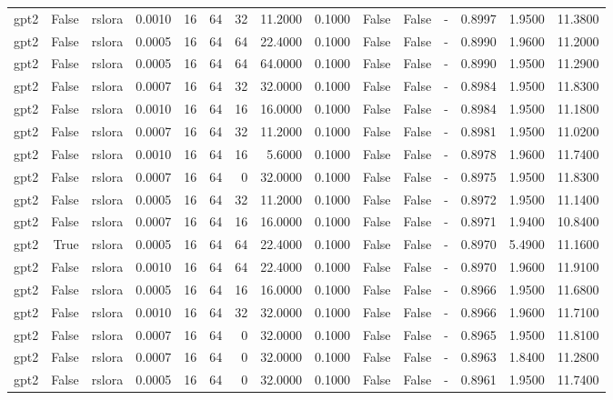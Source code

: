 \begin{tabular}{lrlrrrrrrlllrrr}
gpt2 & False & rslora & 0.0010 & 16 & 64 & 32 & 11.2000 & 0.1000 & False & False & - & 0.8997 & 1.9500 & 11.3800 \\
gpt2 & False & rslora & 0.0005 & 16 & 64 & 64 & 22.4000 & 0.1000 & False & False & - & 0.8990 & 1.9600 & 11.2000 \\
gpt2 & False & rslora & 0.0005 & 16 & 64 & 64 & 64.0000 & 0.1000 & False & False & - & 0.8990 & 1.9500 & 11.2900 \\
gpt2 & False & rslora & 0.0007 & 16 & 64 & 32 & 32.0000 & 0.1000 & False & False & - & 0.8984 & 1.9500 & 11.8300 \\
gpt2 & False & rslora & 0.0010 & 16 & 64 & 16 & 16.0000 & 0.1000 & False & False & - & 0.8984 & 1.9500 & 11.1800 \\
gpt2 & False & rslora & 0.0007 & 16 & 64 & 32 & 11.2000 & 0.1000 & False & False & - & 0.8981 & 1.9500 & 11.0200 \\
gpt2 & False & rslora & 0.0010 & 16 & 64 & 16 & 5.6000 & 0.1000 & False & False & - & 0.8978 & 1.9600 & 11.7400 \\
gpt2 & False & rslora & 0.0007 & 16 & 64 & 0 & 32.0000 & 0.1000 & False & False & - & 0.8975 & 1.9500 & 11.8300 \\
gpt2 & False & rslora & 0.0005 & 16 & 64 & 32 & 11.2000 & 0.1000 & False & False & - & 0.8972 & 1.9500 & 11.1400 \\
gpt2 & False & rslora & 0.0007 & 16 & 64 & 16 & 16.0000 & 0.1000 & False & False & - & 0.8971 & 1.9400 & 10.8400 \\
gpt2 & True & rslora & 0.0005 & 16 & 64 & 64 & 22.4000 & 0.1000 & False & False & - & 0.8970 & 5.4900 & 11.1600 \\
gpt2 & False & rslora & 0.0010 & 16 & 64 & 64 & 22.4000 & 0.1000 & False & False & - & 0.8970 & 1.9600 & 11.9100 \\
gpt2 & False & rslora & 0.0005 & 16 & 64 & 16 & 16.0000 & 0.1000 & False & False & - & 0.8966 & 1.9500 & 11.6800 \\
gpt2 & False & rslora & 0.0010 & 16 & 64 & 32 & 32.0000 & 0.1000 & False & False & - & 0.8966 & 1.9600 & 11.7100 \\
gpt2 & False & rslora & 0.0007 & 16 & 64 & 0 & 32.0000 & 0.1000 & False & False & - & 0.8965 & 1.9500 & 11.8100 \\
gpt2 & False & rslora & 0.0007 & 16 & 64 & 0 & 32.0000 & 0.1000 & False & False & - & 0.8963 & 1.8400 & 11.2800 \\
gpt2 & False & rslora & 0.0005 & 16 & 64 & 0 & 32.0000 & 0.1000 & False & False & - & 0.8961 & 1.9500 & 11.7400 \\

\end{tabular}
